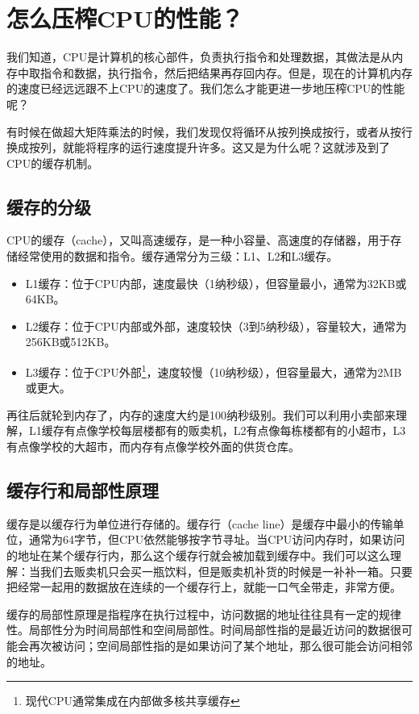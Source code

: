 \section{怎么压榨CPU的性能？}

我们知道，CPU是计算机的核心部件，负责执行指令和处理数据，其做法是从内存中取指令和数据，执行指令，然后把结果再存回内存。但是，现在的计算机内存的速度已经远远跟不上CPU的速度了。我们怎么才能更进一步地压榨CPU的性能呢？

有时候在做超大矩阵乘法的时候，我们发现仅将循环从按列换成按行，或者从按行换成按列，就能将程序的运行速度提升许多。这又是为什么呢？这就涉及到了CPU的缓存机制。

\subsection{缓存的分级}

CPU的缓存（cache），又叫高速缓存，是一种小容量、高速度的存储器，用于存储经常使用的数据和指令。缓存通常分为三级：L1、L2和L3缓存。
\begin{itemize}
  \item L1缓存：位于CPU内部，速度最快（1纳秒级），但容量最小，通常为32KB或64KB。
  \item L2缓存：位于CPU内部或外部，速度较快（3到5纳秒级），容量较大，通常为256KB或512KB。
  \item L3缓存：位于CPU外部\footnote{现代CPU通常集成在内部做多核共享缓存}，速度较慢（10纳秒级），但容量最大，通常为2MB或更大。
\end{itemize}
再往后就轮到内存了，内存的速度大约是100纳秒级别。我们可以利用小卖部来理解，L1缓存有点像学校每层楼都有的贩卖机，L2有点像每栋楼都有的小超市，L3有点像学校的大超市，而内存有点像学校外面的供货仓库。

\subsection{缓存行和局部性原理}

缓存是以缓存行为单位进行存储的。缓存行（cache line）是缓存中最小的传输单位，通常为64字节，但CPU依然能够按字节寻址。当CPU访问内存时，如果访问的地址在某个缓存行内，那么这个缓存行就会被加载到缓存中。我们可以这么理解：当我们去贩卖机只会买一瓶饮料，但是贩卖机补货的时候是一补补一箱。只要把经常一起用的数据放在连续的一个缓存行上，就能一口气全带走，非常方便。

缓存的局部性原理是指程序在执行过程中，访问数据的地址往往具有一定的规律性。局部性分为时间局部性和空间局部性。时间局部性指的是最近访问的数据很可能会再次被访问；空间局部性指的是如果访问了某个地址，那么很可能会访问相邻的地址。

